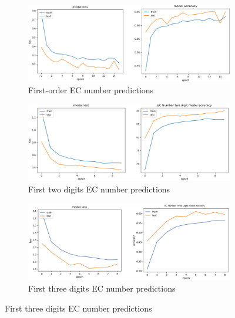 \documentclass[conference]{IEEEtran}
\begin{document}
\begin{figure}[ht]
  \centering

  \begin{subfigure}{0.7\linewidth}
    \includegraphics[width=\linewidth]{images/EC1_Results.png}
    \caption{First-order EC number predictions}
    \label{fig:subfig1}
  \end{subfigure}

  \vspace{0.5cm}

  \begin{subfigure}{0.7\linewidth}
    \includegraphics[width=\linewidth]{images/EC2_Results.png}
    \caption{First two digits EC number predictions}
    \label{fig:subfig2}
  \end{subfigure}

  \vspace{0.5cm}

  \begin{subfigure}{0.7\linewidth}
    \includegraphics[width=\linewidth]{images/EC_3.png}
    \caption{First three digits EC number predictions}
    \label{fig:subfig3}
  \end{subfigure}


\end{figure}
\end{document}
